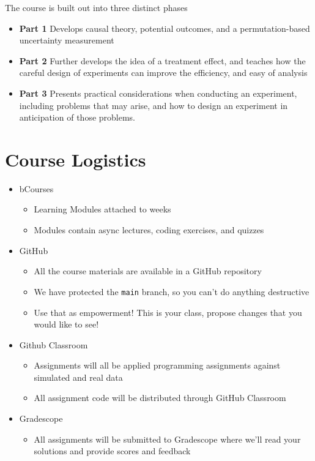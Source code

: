 \documentclass[
]{book}
\providecommand{\tightlist}{%
  \setlength{\itemsep}{0pt}\setlength{\parskip}{0pt}}
\begin{document}
The course is built out into three distinct phases

\begin{itemize}
\tightlist
\item
  \textbf{Part 1} Develops causal theory, potential outcomes, and a
  permutation-based uncertainty measurement
\item
  \textbf{Part 2} Further develops the idea of a treatment effect, and
  teaches how the careful design of experiments can improve the
  efficiency, and easy of analysis
\item
  \textbf{Part 3} Presents practical considerations when conducting an
  experiment, including problems that may arise, and how to design an
  experiment in anticipation of those problems.
\end{itemize}

\hypertarget{course-logistics}{%
\section{Course Logistics}\label{course-logistics}}

\begin{itemize}
\tightlist
\item
  bCourses

  \begin{itemize}
  \tightlist
  \item
    Learning Modules attached to weeks
  \item
    Modules contain async lectures, coding exercises, and quizzes
  \end{itemize}
\item
  GitHub

  \begin{itemize}
  \tightlist
  \item
    All the course materials are available in a GitHub repository
  \item
    We have protected the \texttt{main} branch, so you can't do anything
    destructive
  \item
    Use that as empowerment! This is your class, propose changes that
    you would like to see!
  \end{itemize}
\item
  Github Classroom

  \begin{itemize}
  \tightlist
  \item
    Assignments will all be applied programming assignments against
    simulated and real data
  \item
    All assignment code will be distributed through GitHub Classroom
  \end{itemize}
\item
  Gradescope

  \begin{itemize}
  \tightlist
  \item
    All assignments will be submitted to Gradescope where we'll read
    your solutions and provide scores and feedback
  \end{itemize}
\end{itemize}
\end{document}
